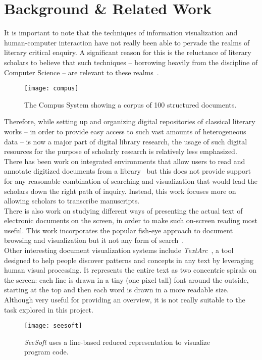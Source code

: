 \documentclass[10pt, twocolumn]{article}
\begin{document}
\section{Background \& Related Work}\label{sec:bgnd}
It is important to note that the techniques of information visualization and human-computer interaction have not really been able to pervade the realms of literary critical enquiry. A significant reason for this is the reluctance of literary scholars to  believe that such techniques -- borrowing heavily from the discipline of Computer Science -- are relevant to these realms~\cite{martha}.  \\
\begin{figure}
\begin{center}
\texttt{[image: compus]} 
\end{center}
\caption{The Compus System showing a corpus of 100 structured documents.} \label{fig:compus}
\end{figure}

Therefore, while setting up and organizing digital repositories of classical literary works -- in order to provide easy access to such vast amounts of heterogeneous data -- is now a major part of digital library research, the usage of such digital resources for the purpose of scholarly research is relatively less emphasized. \\

There has been work on integrated environments that allow users to read and annotate digitized documents from a library~\cite{integrallib} but this does not provide support for any reasonable combination of searching and visualization that would lead the scholars down the right path of inquiry. Instead, this work focuses more on allowing scholars to transcribe manuscripts. \\

There is also work on studying different ways of presenting the actual text of electronic documents on the screen, in order to make such on-screen reading most useful. This work incorporates the popular fish-eye approach to document browsing and visualization but it not any form of search~\cite{readingpatterns}. \\

Other interesting document visualization systems include \textit{TextArc}~\cite{textarc}, a tool designed to help people discover patterns and concepts in any text by leveraging human visual processing. It represents the entire text as two concentric spirals on the screen: each line is drawn in a tiny (one pixel tall) font around the outside, starting at the top and then each word is drawn in a more readable size. Although very useful for providing an overview, it is not really suitable to the task explored in this project. \\
\begin{figure}
\begin{center}
\texttt{[image: seesoft]} 
\end{center}
\caption{\textit{SeeSoft} uses a line-based reduced representation to visualize program code.} \label{fig:seesoft}
\end{figure}
\end{document}
